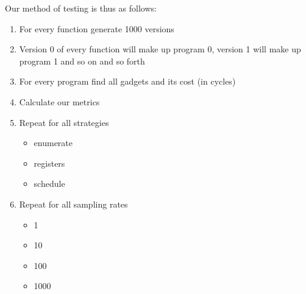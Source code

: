 Our method of testing is thus as follows:

\begin{enumerate}
	\item For every function generate 1000 versions
	\item Version 0 of every function will make up program 0, version 1 will make up program
		1 and so on and so forth
	\item For every program find all gadgets and its cost (in cycles)
	\item Calculate our metrics
	\item Repeat for all strategies
		\begin{itemize}
			\item enumerate
			\item registers
			\item schedule
		\end{itemize}
	\item Repeat for all sampling rates
		\begin{itemize}
			\item 1
			\item 10
			\item 100
			\item 1000
		\end{itemize}
\end{enumerate}

